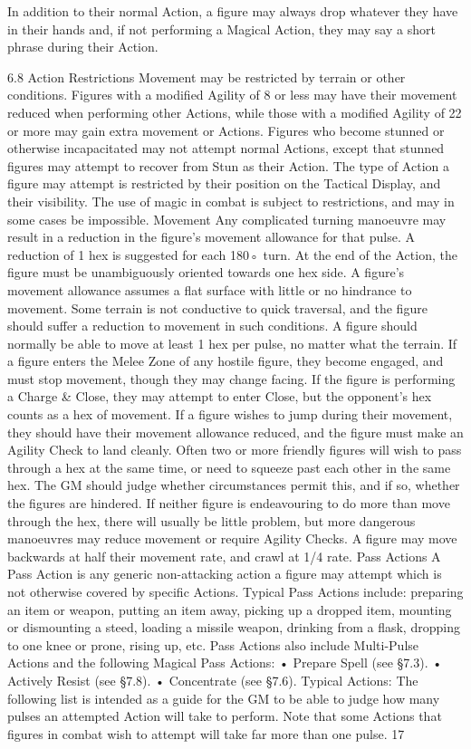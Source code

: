 \documentclass[a4paper]{article}
\begin{document}
\begin{multicols}{3}
In addition to their normal Action, a figure may
always drop whatever they have in their hands and,
if not performing a Magical Action, they may say a
short phrase during their Action.

6.8 Action Restrictions
Movement may be restricted by terrain or other
conditions. Figures with a modified Agility of 8 or
less may have their movement reduced when performing other Actions, while those with a modified
Agility of 22 or more may gain extra movement or
Actions. Figures who become stunned or otherwise
incapacitated may not attempt normal Actions,
except that stunned figures may attempt to recover
from Stun as their Action. The type of Action a
figure may attempt is restricted by their position on
the Tactical Display, and their visibility. The use of
magic in combat is subject to restrictions, and may
in some cases be impossible.
Movement
Any complicated turning manoeuvre may result in
a reduction in the figure’s movement allowance for
that pulse. A reduction of 1 hex is suggested for
each 180◦ turn. At the end of the Action, the figure
must be unambiguously oriented towards one hex
side.
A figure’s movement allowance assumes a flat
surface with little or no hindrance to movement.
Some terrain is not conductive to quick traversal,
and the figure should suffer a reduction to movement in such conditions. A figure should normally
be able to move at least 1 hex per pulse, no matter
what the terrain.
If a figure enters the Melee Zone of any hostile
figure, they become engaged, and must stop
movement, though they may change facing. If the
figure is performing a Charge & Close, they may
attempt to enter Close, but the opponent’s hex
counts as a hex of movement.
If a figure wishes to jump during their movement,
they should have their movement allowance reduced, and the figure must make an Agility Check
to land cleanly.
Often two or more friendly figures will wish to
pass through a hex at the same time, or need to
squeeze past each other in the same hex. The GM
should judge whether circumstances permit this,
and if so, whether the figures are hindered. If neither figure is endeavouring to do more than move
through the hex, there will usually be little problem, but more dangerous manoeuvres may reduce
movement or require Agility Checks.
A figure may move backwards at half their movement rate, and crawl at 1/4 rate.
Pass Actions
A Pass Action is any generic non-attacking action a
figure may attempt which is not otherwise covered
by specific Actions. Typical Pass Actions include:
preparing an item or weapon, putting an item away,
picking up a dropped item, mounting or dismounting a steed, loading a missile weapon, drinking
from a flask, dropping to one knee or prone, rising
up, etc.
Pass Actions also include Multi-Pulse Actions and
the following Magical Pass Actions:
• Prepare Spell (see §7.3).
• Actively Resist (see §7.8).
• Concentrate (see §7.6).
Typical
Actions: The following list is intended as a guide
for the GM to be able to judge how many pulses an
attempted Action will take to perform. Note that
some Actions that figures in combat wish to attempt will take far more than one pulse.
17


\end{multicols}
\end{document}

